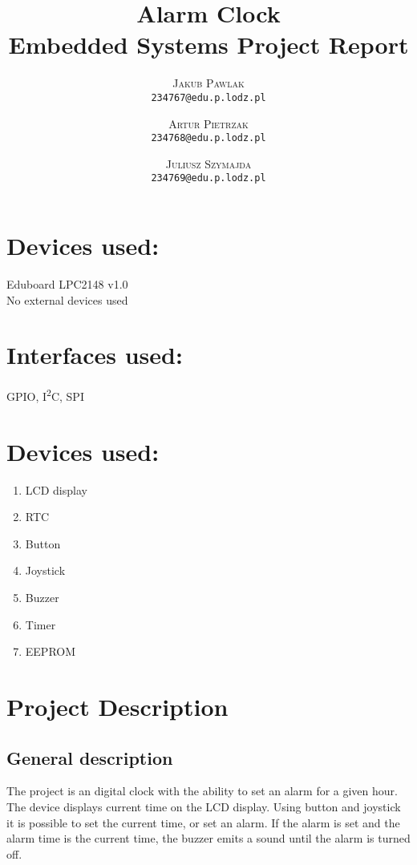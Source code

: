 \documentclass[10pt]{article}
\title{\huge\bf\vspace{-1em} Alarm Clock \\ Embedded Systems Project Report\\\vspace{2em}{\large\normalfont Monday 10:00 lab} }
\author{
    \textsc{Jakub Pawlak} \\
    \texttt{234767@edu.p.lodz.pl}\\
    \and
    \textsc{Artur Pietrzak} \\
    \texttt{234768@edu.p.lodz.pl}\\[1em]
    \and
    \textsc{Juliusz Szymajda} \\
    \texttt{234769@edu.p.lodz.pl}\\
}
\begin{document}
    \maketitle
    \clearpage
    \large
    \section*{Devices used:}
    Eduboard LPC2148 v1.0 \\[1em]
    No external devices used
    \section*{Interfaces used:}
    GPIO, I\textsuperscript{2}C, SPI
    \section*{Devices used:}
    \begin{enumerate}
        \item LCD display
        \item RTC
        \item Button
        \item Joystick
        \item Buzzer
        \item Timer
        \item EEPROM
    \end{enumerate}
    \clearpage
    \tableofcontents
    \clearpage

    \section{Project Description}
    \subsection{General description}
    The project is an digital clock with the ability to set an alarm for a given hour.
    The device displays current time on the LCD display.
    Using button and joystick it is possible to set the current time, or set an alarm.
    If the alarm is set and the alarm time is the current time, the buzzer emits a sound until the alarm is turned off.
\end{document}
